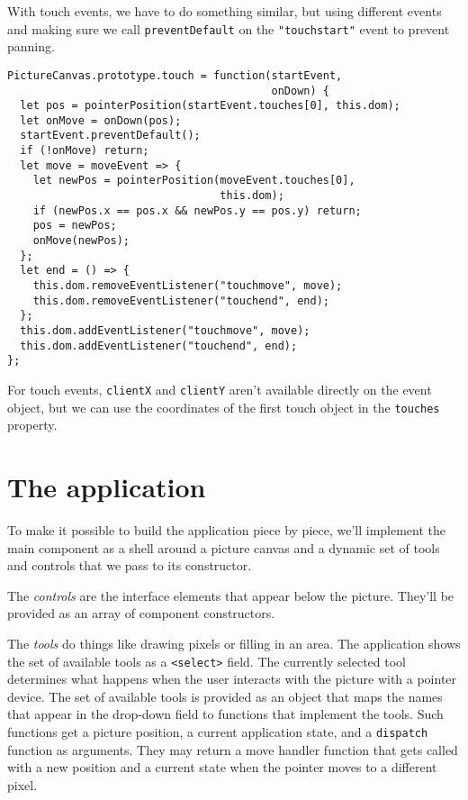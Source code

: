 With touch events, we have to do something similar, but using different events and making sure we call \lstinline`preventDefault` on the \lstinline`"touchstart"` event to prevent panning.

\begin{lstlisting}
PictureCanvas.prototype.touch = function(startEvent,
                                         onDown) {
  let pos = pointerPosition(startEvent.touches[0], this.dom);
  let onMove = onDown(pos);
  startEvent.preventDefault();
  if (!onMove) return;
  let move = moveEvent => {
    let newPos = pointerPosition(moveEvent.touches[0],
                                 this.dom);
    if (newPos.x == pos.x && newPos.y == pos.y) return;
    pos = newPos;
    onMove(newPos);
  };
  let end = () => {
    this.dom.removeEventListener("touchmove", move);
    this.dom.removeEventListener("touchend", end);
  };
  this.dom.addEventListener("touchmove", move);
  this.dom.addEventListener("touchend", end);
};
\end{lstlisting}
\noindent{}

For touch events, \lstinline`clientX` and \lstinline`clientY` aren't available directly on the event object, but we can use the coordinates of the first touch object in the \lstinline`touches` property.

\section{The application}

To make it possible to build the application piece by piece, we'll implement the main component as a shell around a picture canvas and a dynamic set of tools and controls that we pass to its constructor.

The \emph{controls} are the interface elements that appear below the picture. They'll be provided as an array of component constructors.

The \emph{tools} do things like drawing pixels or filling in an area. The application shows the set of available tools as a \lstinline`<select>` field. The currently selected tool determines what happens when the user interacts with the picture with a pointer device. The set of available tools is provided as an object that maps the names that appear in the drop-down field to functions that implement the tools. Such functions get a picture position, a current application state, and a \lstinline`dispatch` function as arguments. They may return a move handler function that gets called with a new position and a current state when the pointer moves to a different pixel.

